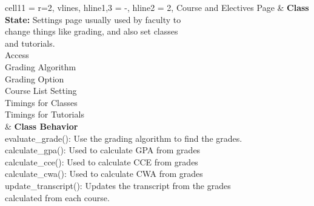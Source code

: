 \documentclass[11pt]{article}
\begin{document}
\begin{longtblr}[
  label = none,
  entry = none,
]{
  cell{1}{1} = {r=2}{},
  vlines,
  hline{1,3} = {-}{},
  hline{2} = {2}{},
}
Course and Electives Page & {\textbf{Class State: }Settings page usually used by faculty to \\
change things like grading, and also set classes\\ and tutorials.\\
\hspace{\dimexpr\labelsep+0.5\tabcolsep}Access\\
\hspace{\dimexpr\labelsep+0.5\tabcolsep}Grading Algorithm\\
\hspace{\dimexpr\labelsep+0.5\tabcolsep}Grading Option\\
\hspace{\dimexpr\labelsep+0.5\tabcolsep}Course List Setting\\
\hspace{\dimexpr\labelsep+0.5\tabcolsep}Timings for Classes\\
\hspace{\dimexpr\labelsep+0.5\tabcolsep}Timings for Tutorials} \\
                          & {\textbf{Class Behavior}\\
\hspace{\dimexpr\labelsep+0.5\tabcolsep}evaluate\_grade(): Use the grading algorithm to find the grades.\\
\hspace{\dimexpr\labelsep+0.5\tabcolsep}calculate\_gpa(): Used to calculate GPA from grades\\
\hspace{\dimexpr\labelsep+0.5\tabcolsep}calculate\_cce(): Used to calculate CCE from grades\\
\hspace{\dimexpr\labelsep+0.5\tabcolsep}calculate\_cwa(): Used to calculate CWA from grades\\
\hspace{\dimexpr\labelsep+0.5\tabcolsep}update\_transcript(): Updates the transcript from the grades \\
calculated from each course.}
\end{longtblr}
\end{document}
